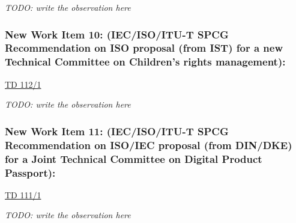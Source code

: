 \textit{TODO: write the observation here}

\subsubsection{New Work Item 10: (IEC/ISO/ITU-T SPCG Recommendation on ISO proposal (from IST) for a new Technical Committee on Children's rights management):}

\href{https://www.itu.int/md/meetingdoc.asp?lang=en\&parent=T25-SG17-251203-TD-WP1-0112}{TD 112/1}

\textit{TODO: write the observation here}

\subsubsection{New Work Item 11: (IEC/ISO/ITU-T SPCG Recommendation on ISO/IEC proposal (from DIN/DKE) for a Joint Technical Committee on Digital Product Passport):}

\href{https://www.itu.int/md/meetingdoc.asp?lang=en\&parent=T25-SG17-251203-TD-WP1-0111}{TD 111/1}

\textit{TODO: write the observation here}
